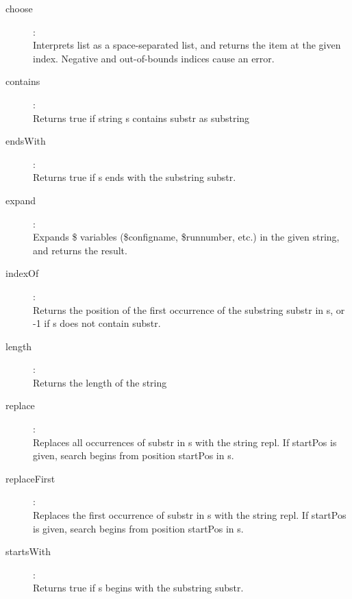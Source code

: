 \begin{description}
\item[choose]:  \\
    Interprets list as a space-separated list, and returns the item at the
    given index. Negative and out-of-bounds indices cause an error.

\item[contains]:  \\
    Returns true if string s contains substr as substring

\item[endsWith]:  \\
    Returns true if s ends with the substring substr.

\item[expand]:  \\
    Expands \${} variables (\${configname}, \${runnumber}, etc.) in the given
    string, and returns the result.

\item[indexOf]:  \\
    Returns the position of the first occurrence of the substring substr in s,
    or -1 if s does not contain substr.

\item[length]:  \\
    Returns the length of the string

\item[replace]:  \\
    Replaces all occurrences of substr in s with the string repl. If startPos
    is given, search begins from position startPos in s.

\item[replaceFirst]:  \\
    Replaces the first occurrence of substr in s with the string repl. If
    startPos is given, search begins from position startPos in s.

\item[startsWith]:  \\
    Returns true if s begins with the substring substr.


\end{description}
